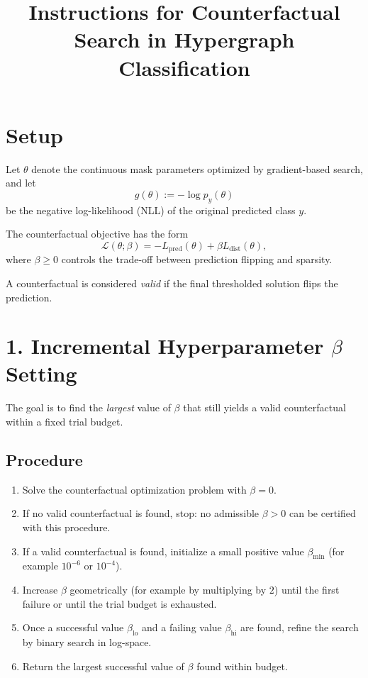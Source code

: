 \documentclass[11pt]{article}
\title{Instructions for Counterfactual Search in Hypergraph Classification}
\author{}
\date{}
\begin{document}
\maketitle

\section{Setup}
Let $\theta$ denote the continuous mask parameters optimized by gradient-based search, and let
\[
g(\theta) := -\log p_y(\theta)
\]
be the negative log-likelihood (NLL) of the original predicted class $y$.

The counterfactual objective has the form
\[
\mathcal{L}(\theta;\beta) = -L_{\mathrm{pred}}(\theta) + \beta L_{\mathrm{dist}}(\theta),
\]
where $\beta \ge 0$ controls the trade-off between prediction flipping and sparsity.

A counterfactual is considered \emph{valid} if the final thresholded solution flips the prediction.

\section{1. Incremental Hyperparameter $\beta$ Setting}
The goal is to find the \emph{largest} value of $\beta$ that still yields a valid counterfactual within a fixed trial budget.

\subsection*{Procedure}
\begin{enumerate}
    \item Solve the counterfactual optimization problem with $\beta = 0$.
    \item If no valid counterfactual is found, stop: no admissible $\beta > 0$ can be certified with this procedure.
    \item If a valid counterfactual is found, initialize a small positive value $\beta_{\min}$ (for example $10^{-6}$ or $10^{-4}$).
    \item Increase $\beta$ geometrically (for example by multiplying by $2$) until the first failure or until the trial budget is exhausted.
    \item Once a successful value $\beta_{\mathrm{lo}}$ and a failing value $\beta_{\mathrm{hi}}$ are found, refine the search by binary search in log-space.
    \item Return the largest successful value of $\beta$ found within budget.
\end{enumerate}
\end{document}
